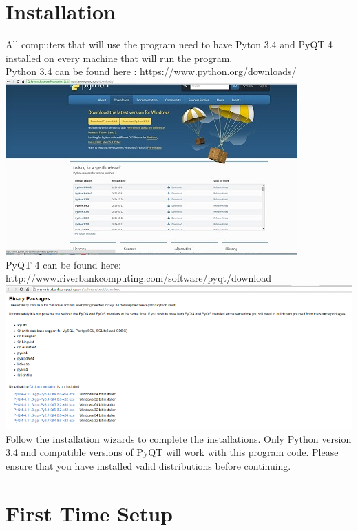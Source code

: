 \documentclass{report}
\begin{document}
\chapter{Installation}
 All computers that will use the program need to have Pyton 3.4 and PyQT 4 installed on every machine that will run the program.\\
 Python 3.4 can be found here : https://www.python.org/downloads/\\
\includegraphics{PythonDownload}\\
 \clearpage
 PyQT 4 can be found here: http://www.riverbankcomputing.com/software/pyqt/download\\
 \includegraphics{PyQTDownload}\\
Follow the installation wizards to complete the installations.
Only Python version 3.4 and compatible versions of PyQT will work with this program code. Please ensure that you have installed valid distributions before continuing.\\
 
 
\chapter{First Time Setup}
\end{document}
